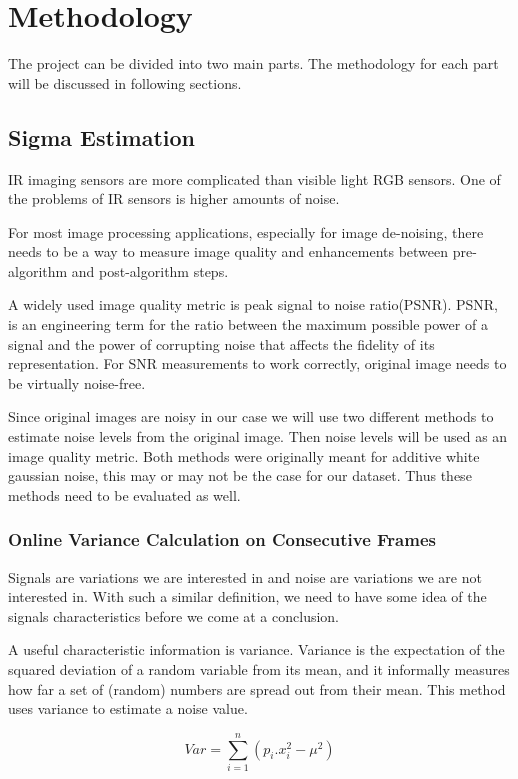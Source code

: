\documentclass[10pt,twocolumn,letterpaper]{article}
\begin{document}
\section{Methodology}
The project can be divided into two main parts. The methodology for each part will be discussed in following sections.

\subsection{Sigma Estimation}
IR imaging sensors are more complicated than visible light RGB sensors. One of the problems of IR sensors is higher amounts of noise. 

For most image processing applications, especially for image de-noising, there needs to be a way to measure image quality and enhancements between pre-algorithm and post-algorithm steps.

A widely used image quality metric is peak signal to noise ratio(PSNR). PSNR, is an engineering term for the ratio between the maximum possible power of a signal and the power of corrupting noise that affects the fidelity of its representation\cite{wiki:psnr}. For SNR measurements to work correctly, original image needs to be virtually noise-free.

Since original images are noisy in our case we will use two different methods to estimate noise levels from the original image. Then noise levels will be used as an image quality metric. Both methods were originally meant for additive white gaussian noise, this may or may not be the case for our dataset. Thus these methods need to be evaluated as well.
\subsubsection{Online Variance Calculation on Consecutive Frames} \label{ss:online-var}
Signals are variations we are interested in and noise are variations we are not interested in. With such a similar definition, we need to have some idea of the signals characteristics before we come at a conclusion. 

A useful characteristic information is variance. Variance is the expectation of the squared deviation of a random variable from its mean, and it informally measures how far a set of (random) numbers are spread out from their mean\cite{wiki:variance}. This method uses variance to estimate a noise value.

\begin{displaymath}
Var = \sum_{i=1}^{n} (p_i.x^2_i - \mu^2)
\end{displaymath}\label{eq:disc-var}
\end{document}
